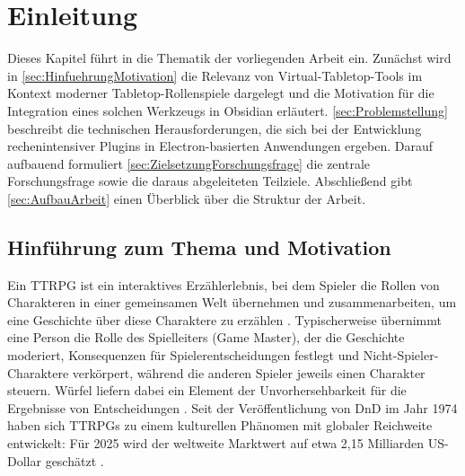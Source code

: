 


\chapter{Einleitung}
\label{sec:Einleitung}

Dieses Kapitel führt in die Thematik der vorliegenden Arbeit ein. Zunächst wird in \autoref{sec:HinfuehrungMotivation} die Relevanz von Virtual-Tabletop-Tools im Kontext moderner Tabletop-Rollenspiele dargelegt und die Motivation für die Integration eines solchen Werkzeugs in Obsidian erläutert. \autoref{sec:Problemstellung} beschreibt die technischen Herausforderungen, die sich bei der Entwicklung rechenintensiver Plugins in Electron-basierten Anwendungen ergeben. Darauf aufbauend formuliert \autoref{sec:ZielsetzungForschungsfrage} die zentrale Forschungsfrage sowie die daraus abgeleiteten Teilziele. Abschließend gibt \autoref{sec:AufbauArbeit} einen Überblick über die Struktur der Arbeit.

\section{Hinführung zum Thema und Motivation}
\label{sec:HinfuehrungMotivation}

Ein \ac{TTRPG} ist ein interaktives Erzählerlebnis, bei dem Spieler die Rollen von Charakteren in einer gemeinsamen Welt übernehmen und zusammenarbeiten, um eine Geschichte über diese Charaktere zu erzählen \autocite[S.~4]{Daggerheart2025}. Typischerweise übernimmt eine Person die Rolle des Spielleiters (Game Master), der die Geschichte moderiert, Konsequenzen für Spielerentscheidungen festlegt und Nicht-Spieler-Charaktere verkörpert, während die anderen Spieler jeweils einen Charakter steuern. Würfel liefern dabei ein Element der Unvorhersehbarkeit für die Ergebnisse von Entscheidungen \autocite[S.~4]{Daggerheart2025}. Seit der Veröffentlichung von \ac{DnD} im Jahr 1974 haben sich \ac{TTRPG}s zu einem kulturellen Phänomen mit globaler Reichweite entwickelt: Für 2025 wird der weltweite Marktwert auf etwa 2,15 Milliarden US-Dollar geschätzt \autocite{BusinessResearchInsights2025}.

